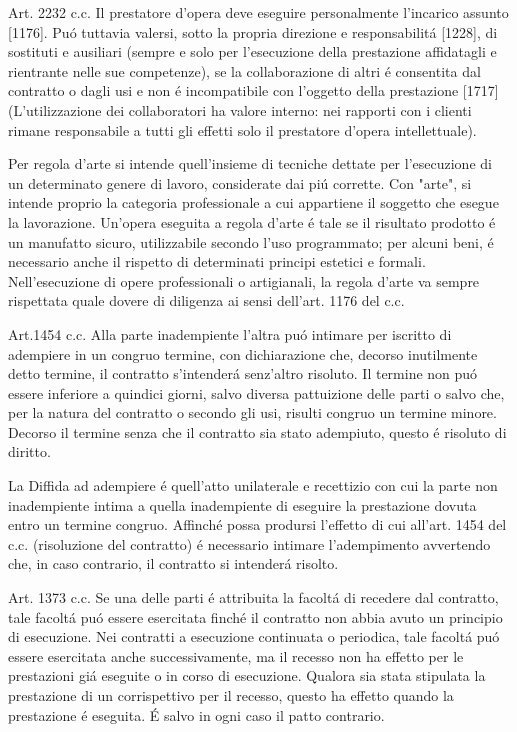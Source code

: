 \documentclass{article}
\begin{document}
Art. 2232 c.c. Il prestatore d'opera deve eseguire personalmente l'incarico assunto [1176]. Pu\'o tuttavia valersi, sotto la propria direzione e responsabilit\'a [1228], di sostituti e ausiliari (sempre e solo per l'esecuzione della prestazione affidatagli e rientrante nelle sue competenze), se la collaborazione di altri \'e consentita dal contratto o dagli usi e non \'e incompatibile con l'oggetto della prestazione [1717] (L'utilizzazione dei collaboratori ha valore interno: nei rapporti con i clienti rimane responsabile a tutti gli effetti solo il prestatore d'opera intellettuale).

Per regola d'arte si intende quell'insieme di tecniche dettate per l'esecuzione di un determinato genere di lavoro, considerate dai pi\'u corrette. Con "arte", si intende proprio la categoria professionale a cui appartiene il soggetto che esegue la lavorazione. Un'opera eseguita a regola d'arte \'e tale se il risultato prodotto \' e un manufatto sicuro, utilizzabile secondo l'uso programmato; per alcuni beni, \'e necessario anche il rispetto di determinati principi estetici e formali. Nell'esecuzione di opere professionali o artigianali, la regola d'arte va sempre rispettata quale dovere di diligenza ai sensi dell'art. 1176 del c.c.

Art.1454 c.c. Alla parte inadempiente l'altra pu\'o intimare per iscritto di adempiere in un congruo termine, con dichiarazione che, decorso inutilmente detto termine, il contratto s'intender\'a senz'altro risoluto. Il termine non pu\'o essere inferiore a quindici giorni, salvo diversa pattuizione delle parti o salvo che, per la natura del contratto o secondo gli usi, risulti congruo un termine minore. Decorso il termine senza che il contratto sia stato adempiuto, questo \'e risoluto di diritto.

La Diffida ad adempiere \'e quell'atto unilaterale e recettizio con cui la parte non inadempiente intima a quella inadempiente di eseguire la prestazione dovuta entro un termine congruo. Affinch\'e possa prodursi l'effetto di cui all'art. 1454 del c.c. (risoluzione del contratto) \'e necessario intimare l'adempimento avvertendo che, in caso contrario, il contratto si intender\'a risolto.

Art. 1373 c.c. Se una delle parti \'e attribuita la facolt\'a di recedere dal contratto, tale facolt\'a pu\'o essere esercitata finch\'e il contratto non abbia avuto un principio di esecuzione. Nei contratti a esecuzione continuata o periodica, tale facolt\'a pu\'o essere esercitata anche successivamente, ma il recesso non ha effetto per le prestazioni gi\'a eseguite o in corso di esecuzione. Qualora sia stata stipulata la prestazione di un corrispettivo per il recesso, questo ha effetto quando la prestazione \'e eseguita. \'E salvo in ogni caso il patto contrario. 
\end{document}
